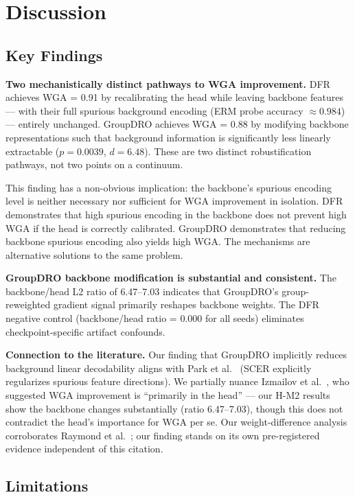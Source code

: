 \section{Discussion}
\label{sec:discussion}

\subsection{Key Findings}

\textbf{Two mechanistically distinct pathways to WGA improvement.} DFR achieves WGA = 0.91 by recalibrating the head while leaving backbone features --- with their full spurious background encoding (ERM probe accuracy $\approx 0.984$) --- entirely unchanged. GroupDRO achieves WGA = 0.88 by modifying backbone representations such that background information is significantly less linearly extractable ($p = 0.0039$, $d = 6.48$). These are two distinct robustification pathways, not two points on a continuum.

This finding has a non-obvious implication: the backbone's spurious encoding level is neither necessary nor sufficient for WGA improvement in isolation. DFR demonstrates that high spurious encoding in the backbone does not prevent high WGA if the head is correctly calibrated. GroupDRO demonstrates that reducing backbone spurious encoding also yields high WGA. The mechanisms are alternative solutions to the same problem.

\textbf{GroupDRO backbone modification is substantial and consistent.} The backbone/head L2 ratio of 6.47--7.03 indicates that GroupDRO's group-reweighted gradient signal primarily reshapes backbone weights. The DFR negative control (backbone/head ratio = 0.000 for all seeds) eliminates checkpoint-specific artifact confounds.

\textbf{Connection to the literature.} Our finding that GroupDRO implicitly reduces background linear decodability aligns with Park et al.\ \cite{park2025spurious} (SCER explicitly regularizes spurious feature directions). We partially nuance Izmailov et al.\ \cite{izmailov2022feature}, who suggested WGA improvement is ``primarily in the head'' --- our H-M2 results show the backbone changes substantially (ratio 6.47--7.03), though this does not contradict the head's importance for WGA per se. Our weight-difference analysis corroborates Raymond et al.\ \cite{raymond2026groupdro}; our finding stands on its own pre-registered evidence independent of this citation.

\subsection{Limitations}

